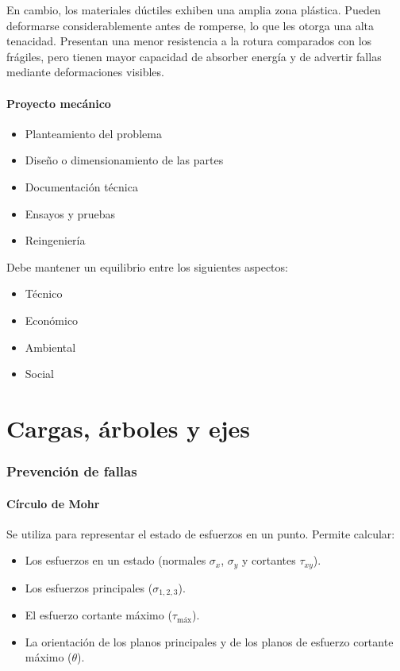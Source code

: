 \documentclass[spanish,11pt,a4paper]{article}
\begin{document}
	En cambio, los materiales dúctiles exhiben una amplia zona plástica. Pueden deformarse considerablemente antes de romperse, lo que les otorga una alta tenacidad. Presentan una menor resistencia a la rotura comparados con los frágiles, pero tienen mayor capacidad de absorber energía y de advertir fallas mediante deformaciones visibles.

	
	\subsection{Proyecto mecánico}
	
	\begin{itemize}
		\item Planteamiento del problema
		\item Diseño o dimensionamiento de las partes
		\item Documentación técnica
		\item Ensayos y pruebas
		\item Reingeniería
	\end{itemize}
	
	Debe mantener un equilibrio entre los siguientes aspectos:
	\begin{itemize}
		\item Técnico
		\item Económico
		\item Ambiental
		\item Social
	\end{itemize}
	
	\part{Cargas, árboles y ejes}
	
	\section{Prevención de fallas}
	
	\subsection{Círculo de Mohr}
	
	Se utiliza para representar el estado de esfuerzos en un punto. Permite calcular:
	\begin{itemize}
		\item Los esfuerzos en un estado (normales $\sigma_{x}$, $\sigma_y$ y cortantes $\tau_{xy}$).
		\item Los esfuerzos principales ($\sigma_{1,2,3}$).
		\item El esfuerzo cortante máximo ($\tau_\text{máx}$).
		\item La orientación de los planos principales y de los planos de esfuerzo cortante máximo ($\theta$).
	\end{itemize}
	
\end{document}
